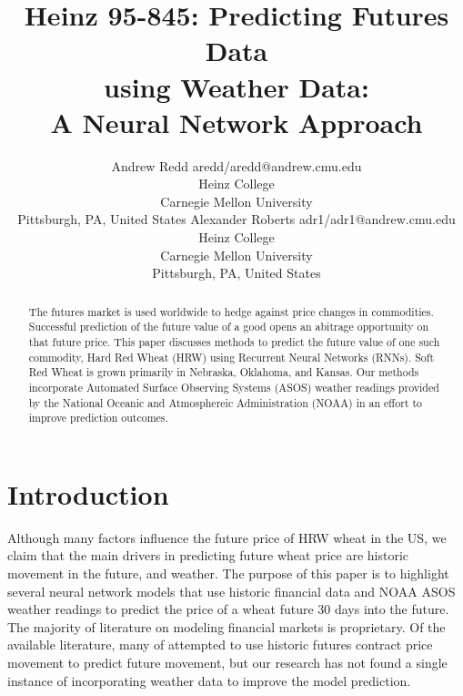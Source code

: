 \documentclass[twoside,11pt]{article}
\begin{document}
\title{Heinz 95-845: Predicting Futures Data\\ using Weather Data:\\ A Neural Network Approach}

\author{\name Andrew Redd \email aredd/aredd@andrew.cmu.edu \\
       \addr Heinz College\\
       Carnegie Mellon University\\
       Pittsburgh, PA, United States
       \AND
       \name Alexander Roberts \email adr1/adr1@andrew.cmu.edu \\
       \addr Heinz College\\
       Carnegie Mellon University\\
       Pittsburgh, PA, United States}


\maketitle

\begin{abstract}
  The futures market is used worldwide to hedge against price changes in commodities. Successful prediction of the future value of a good opens an abitrage opportunity on that future price. This paper discusses methods to predict the future value of one such commodity, Hard Red Wheat (HRW) using Recurrent Neural Networks (RNNs). Soft Red Wheat is grown primarily in Nebraska, Oklahoma, and Kansas. Our methods incorporate Automated Surface Observing Systems (ASOS) weather readings provided by the National Oceanic and Atmosphereic Administration (NOAA) in an effort to improve prediction outcomes.
\end{abstract}

\section{Introduction}

Although many factors influence the future price of HRW wheat in the US, we claim that the main drivers in predicting future wheat price are historic movement in the future, and weather. The purpose of this paper is to highlight several neural network models that use historic financial data and NOAA ASOS weather readings to predict the price of a wheat future 30 days into the future. The majority of literature on modeling financial markets is proprietary. Of the available literature, many of attempted to use historic futures contract price movement to predict future movement, but our research has not found a single instance of incorporating weather data to improve the model prediction. 
\end{document}
